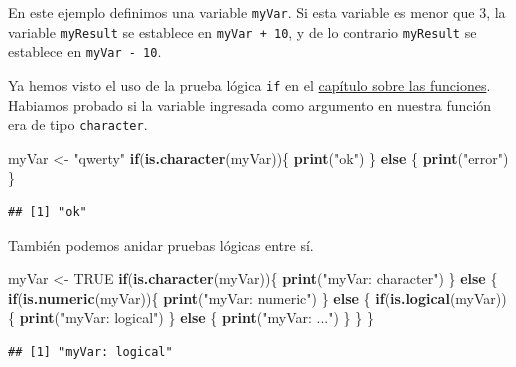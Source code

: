 \documentclass[
]{book}
\newenvironment{Shaded}{\begin{snugshade}}{\end{snugshade}}
\newcommand{\ControlFlowTok}[1]{\textcolor[rgb]{0.13,0.29,0.53}{\textbf{#1}}}
\newcommand{\KeywordTok}[1]{\textcolor[rgb]{0.13,0.29,0.53}{\textbf{#1}}}
\newcommand{\NormalTok}[1]{#1}
\newcommand{\OtherTok}[1]{\textcolor[rgb]{0.56,0.35,0.01}{#1}}
\newcommand{\StringTok}[1]{\textcolor[rgb]{0.31,0.60,0.02}{#1}}
\begin{document}
En este ejemplo definimos una variable \texttt{myVar}. Si esta variable es menor que 3, la variable \texttt{myResult} se establece en \texttt{myVar\ +\ 10}, y de lo contrario \texttt{myResult} se establece en \texttt{myVar\ -\ 10}.

Ya hemos visto el uso de la prueba lógica \texttt{if} en el \protect\hyperlink{l015function}{capítulo sobre las funciones}. Habiamos probado si la variable ingresada como argumento en nuestra función era de tipo \texttt{character}.

\begin{Shaded}
\begin{Highlighting}[]
\NormalTok{myVar <-}\StringTok{ "qwerty"}
\ControlFlowTok{if}\NormalTok{(}\KeywordTok{is.character}\NormalTok{(myVar))\{}
  \KeywordTok{print}\NormalTok{(}\StringTok{"ok"}\NormalTok{)}
\NormalTok{\} }\ControlFlowTok{else}\NormalTok{ \{}
  \KeywordTok{print}\NormalTok{(}\StringTok{"error"}\NormalTok{)}
\NormalTok{\}}
\end{Highlighting}
\end{Shaded}

\begin{verbatim}
## [1] "ok"
\end{verbatim}

También podemos anidar pruebas lógicas entre sí.

\begin{Shaded}
\begin{Highlighting}[]
\NormalTok{myVar <-}\StringTok{ }\OtherTok{TRUE}
\ControlFlowTok{if}\NormalTok{(}\KeywordTok{is.character}\NormalTok{(myVar))\{}
  \KeywordTok{print}\NormalTok{(}\StringTok{"myVar: character"}\NormalTok{)}
\NormalTok{\} }\ControlFlowTok{else}\NormalTok{ \{}
  \ControlFlowTok{if}\NormalTok{(}\KeywordTok{is.numeric}\NormalTok{(myVar))\{}
    \KeywordTok{print}\NormalTok{(}\StringTok{"myVar: numeric"}\NormalTok{)}
\NormalTok{  \} }\ControlFlowTok{else}\NormalTok{ \{}
    \ControlFlowTok{if}\NormalTok{(}\KeywordTok{is.logical}\NormalTok{(myVar))\{}
      \KeywordTok{print}\NormalTok{(}\StringTok{"myVar: logical"}\NormalTok{)}
\NormalTok{    \} }\ControlFlowTok{else}\NormalTok{ \{}
      \KeywordTok{print}\NormalTok{(}\StringTok{"myVar: ..."}\NormalTok{)}
\NormalTok{    \}}
\NormalTok{  \}}
\NormalTok{\}}
\end{Highlighting}
\end{Shaded}

\begin{verbatim}
## [1] "myVar: logical"
\end{verbatim}
\end{document}
